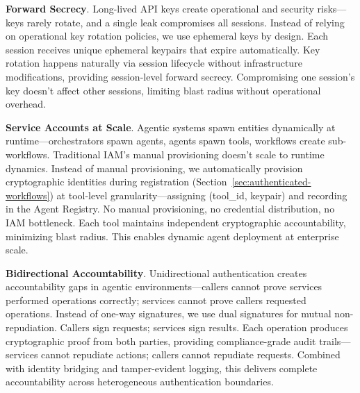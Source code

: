 \textbf{Forward Secrecy}. Long-lived API keys create operational and security risks—keys rarely rotate, and a single leak compromises all sessions. Instead of relying on operational key rotation policies, we use ephemeral keys by design. Each session receives unique ephemeral keypairs that expire automatically. Key rotation happens naturally via session lifecycle without infrastructure modifications, providing session-level forward secrecy. Compromising one session's key doesn't affect other sessions, limiting blast radius without operational overhead.

\textbf{Service Accounts at Scale}. Agentic systems spawn entities dynamically at runtime—orchestrators spawn agents, agents spawn tools, workflows create sub-workflows. Traditional IAM's manual provisioning doesn't scale to runtime dynamics. Instead of manual provisioning, we automatically provision cryptographic identities during registration (Section~\ref{sec:authenticated-workflows}) at tool-level granularity—assigning (tool\_id, keypair) and recording in the Agent Registry. No manual provisioning, no credential distribution, no IAM bottleneck. Each tool maintains independent cryptographic accountability, minimizing blast radius. This enables dynamic agent deployment at enterprise scale.

\textbf{Bidirectional Accountability}. Unidirectional authentication creates accountability gaps in agentic environments—callers cannot prove services performed operations correctly; services cannot prove callers requested operations. Instead of one-way signatures, we use dual signatures for mutual non-repudiation. Callers sign requests; services sign results. Each operation produces cryptographic proof from both parties, providing compliance-grade audit trails—services cannot repudiate actions; callers cannot repudiate requests. Combined with identity bridging and tamper-evident logging, this delivers complete accountability across heterogeneous authentication boundaries.
